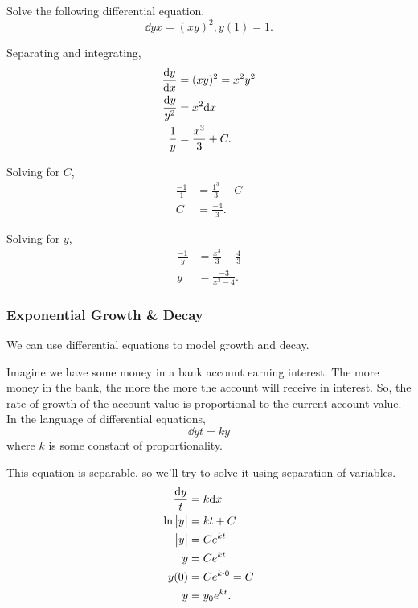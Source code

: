 \begin{example}
	Solve the following differential equation.
	\begin{equation*}
		\dd{y}{x} = (xy)^2, y(1)=1.
	\end{equation*}
\end{example}
\begin{answer}
	Separating and integrating,
	\begin{align*}
		\frac{\mathrm{d} y}{\mathrm{d} x} &= (xy)^2 = x^2y^2 \\
		\frac{\mathrm{d} y}{y^2} &= x^2\mathrm{d} x \\
		\frac{1}{y} &= \frac{x^3}{3} + C. \\
	\end{align*}
	
	Solving for $C$,
	\begin{align*}
		\frac{-1}{1} &= \frac{1^3}{3} + C \\
		C &= \frac{-4}{3}.
	\end{align*}
	
	Solving for $y$,
	\begin{align*}
		\frac{-1}{y} &= \frac{x^3}{3} - \frac{4}{3} \\
		y &= \frac{-3}{x^3 - 4}.
	\end{align*}
\end{answer}

\subsubsection{Exponential Growth \& Decay}
We can use differential equations to model growth and decay.

\begin{example}
	Imagine we have some money in a bank account earning interest.
	The more money in the bank, the more the more the account will receive in interest.
	So, the rate of growth of the account value is proportional to the current account value.
	In the language of differential equations,
	\begin{equation*}
		\dd{y}{t} = ky
	\end{equation*}
	where $k$ is some constant of proportionality.
\end{example}
\begin{answer}
	This equation is separable, so we'll try to solve it using separation of variables.
	\begin{align*}
		\frac{\mathrm{d} y}{t} &= k\mathrm{d} x \\
		\ln{\big\lvert y \big\rvert} &= kt + C \\
		\big\lvert y \big\rvert &= Ce^{kt} \\
		y &= Ce^{kt} \\
		y(0) &= Ce^{k\cdot 0} = C \\
		y &= y_0e^{kt}.
	\end{align*}
\end{answer}

